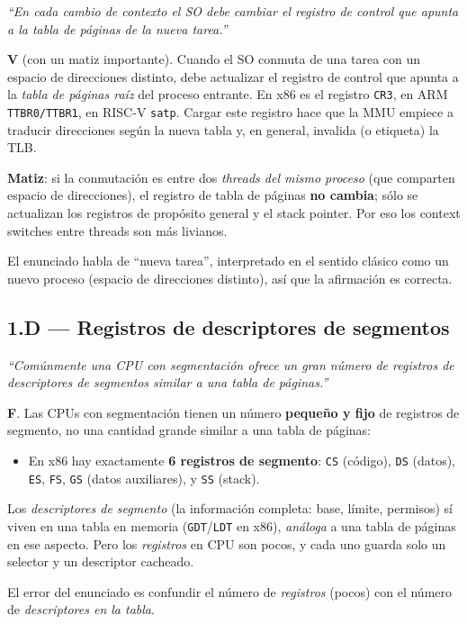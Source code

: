 \documentclass[11pt,a4paper]{article}
\begin{document}
\emph{``En cada cambio de contexto el SO debe cambiar el registro de
control que apunta a la tabla de páginas de la nueva tarea.''}

\begin{respuesta}
\textbf{V} (con un matiz importante). Cuando el SO conmuta de una
tarea con un espacio de direcciones distinto, debe actualizar el
registro de control que apunta a la \emph{tabla de páginas raíz} del
proceso entrante. En x86 es el registro \texttt{CR3}, en ARM
\texttt{TTBR0/TTBR1}, en RISC-V \texttt{satp}. Cargar este registro
hace que la MMU empiece a traducir direcciones según la nueva
tabla y, en general, invalida (o etiqueta) la TLB.

\textbf{Matiz}: si la conmutación es entre dos \emph{threads del
mismo proceso} (que comparten espacio de direcciones), el registro de
tabla de páginas \textbf{no cambia}; sólo se actualizan los registros
de propósito general y el stack pointer. Por eso los context switches
entre threads son más livianos.

El enunciado habla de ``nueva tarea'', interpretado en el sentido
clásico como un nuevo proceso (espacio de direcciones distinto), así
que la afirmación es correcta.
\end{respuesta}

\subsection*{1.D --- Registros de descriptores de segmentos}

\emph{``Comúnmente una CPU con segmentación ofrece un gran número de
registros de descriptores de segmentos similar a una tabla de
páginas.''}

\begin{respuesta}
\textbf{F}. Las CPUs con segmentación tienen un número
\textbf{pequeño y fijo} de registros de segmento, no una cantidad
grande similar a una tabla de páginas:

\begin{itemize}[leftmargin=*,nosep]
    \item En x86 hay exactamente \textbf{6 registros de segmento}:
        \texttt{CS} (código), \texttt{DS} (datos), \texttt{ES},
        \texttt{FS}, \texttt{GS} (datos auxiliares), y \texttt{SS}
        (stack).
\end{itemize}

Los \emph{descriptores de segmento} (la información completa: base,
límite, permisos) sí viven en una tabla en memoria
(\texttt{GDT}/\texttt{LDT} en x86), \emph{análoga} a una tabla de
páginas en ese aspecto. Pero los \emph{registros} en CPU son pocos,
y cada uno guarda solo un selector y un descriptor cacheado.

El error del enunciado es confundir el número de \emph{registros}
(pocos) con el número de \emph{descriptores en la tabla}.
\end{respuesta}
\end{document}
